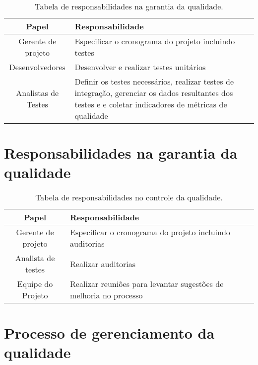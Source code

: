 
\begin{table}[H]
	\begin{tabularx}{\textwidth}{| c | X |}
		\hline
		\textbf{Papel}     & \textbf{Responsabilidade}                            \\
		\hline
		Gerente de projeto & Especificar o cronograma do projeto incluindo testes \\
		\hline
		Desenvolvedores & Desenvolver e realizar testes unitários  \\
		\hline
		Analistas de Testes & Definir os testes necessários, realizar testes de integração, gerenciar os dados resultantes dos testes e e coletar indicadores de métricas de qualidade \\
		\hline
	\end{tabularx}
	\centering
	\caption{Tabela de responsabilidades na garantia da qualidade.}
	\label{tab:responsability-quality-guarantee}
\end{table}

\section{Responsabilidades na garantia da qualidade}


\begin{table}[H]
	\begin{tabularx}{\textwidth}{| c | X |}
		\hline
		\textbf{Papel}     & \textbf{Responsabilidade}                            \\
		\hline
		Gerente de projeto & Especificar o cronograma do projeto incluindo auditorias \\
		\hline
		Analista de testes & Realizar auditorias \\
		\hline
		Equipe do Projeto & Realizar reuniões para levantar sugestões de melhoria no processo \\
		\hline
	\end{tabularx}
	\centering
	\caption{Tabela de responsabilidades no controle da qualidade.}
	\label{tab:responsability-quality-control}
\end{table}

\section{Processo de gerenciamento da qualidade}

